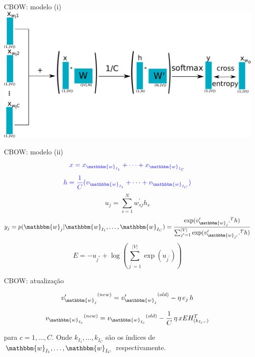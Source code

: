 \documentclass{beamer}
\newcommand{\wo}{\mathbbm{w}}
\begin{document}
\begin{frame}[fragile]{CBOW: modelo (i)}
\includegraphics[scale=0.65]{cbow.pdf}
\end{frame}

\begin{frame}[fragile]{CBOW: modelo (ii)}
\begin{equation}\label{eq:13}
{\color{blue!89}x = x_{\wo_{I_{1}}} + \dots + x_{\wo_{I_{C}}}}
\end{equation}
\begin{equation}\label{eq:14}
{\color{blue!89}h = \frac{1}{C}(v_{\wo_{I_{1}}} + \dots + v_{\wo_{I_{C}}}) }
\end{equation}
\begin{equation}\label{eq:15}
u_j = \sum_{s=1}^{N}w^{\prime}_{sj} h_{s}
\end{equation}
\begin{equation}\label{eq:16}
y_j = p(\wo_{j}|\wo_{I_{1}},\dots, \wo_{I_{C}}) =  \frac{\exp(v^{\prime}_{\wo_{j}} .^{T} h)}{\sum_{j^{\prime}=1}^{|V|} \exp(v^{\prime}_{\wo_{{j^\prime}}} .^{T} h)} 
\end{equation}
\begin{equation}\label{eq:17}
E = - u_{j^{*}} + \log (\sum_{j^{\prime}=1}^{|V|} \exp (u_{j^{\prime}}))
\end{equation}
\end{frame}


\begin{frame}[fragile]{CBOW: atualização}

\begin{equation}\label{eq:18}
{v^{\prime}_{\wo_{j}}}^{(new)} = {v^{\prime}_{\wo_{j}}}^{(old)} - \eta \, e_{j} \, h
\end{equation}

\vspace{0.3cm}

\begin{equation}\label{eq:19}
{v_{\wo_{I_{c}}}}^{(new)} = {v_{\wo_{I_{c}}}}^{(old)} - \frac{1}{C} \, \eta \, x EH^{T}_{(k_{I_{c}},.)} 
\end{equation}

\vspace{0.3cm}

para $c = 1, \dots, C$. Onde $k_{I_{1}}, \dots, k_{I_{C}}$ são os índices de $\wo_{I_{1}},\dots, \wo_{I_{C}}$ respectivamente.
\end{frame}
\end{document}
